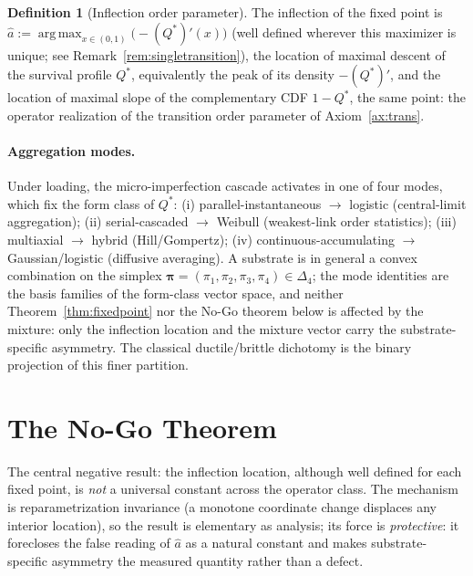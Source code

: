 \documentclass[11pt]{article}
\theoremstyle{plain}
\theoremstyle{definition}
\newtheorem{definition}[theorem]{Definition}
\theoremstyle{remark}
\DeclareMathOperator*{\argmax}{arg\,max}
\begin{document}
\begin{definition}[Inflection order parameter]\label{def:ahat}
The inflection of the fixed point is $\hat a:=\argmax_{x\in(0,1)}\big(-(Q^*)'(x)\big)$ (well defined wherever this maximizer is unique; see Remark~\ref{rem:singletransition}), the location of maximal descent of the survival profile $Q^*$, equivalently the peak of its density $-(Q^*)'$, and the location of maximal slope of the complementary CDF $1-Q^*$, the same point: the operator realization of the transition order parameter of Axiom~\ref{ax:trans}.
\end{definition}

\paragraph{Aggregation modes.} Under loading, the micro-imperfection cascade activates in one of four modes, which fix the form class of $Q^*$: (i) parallel-instantaneous $\to$ logistic (central-limit aggregation); (ii) serial-cascaded $\to$ Weibull (weakest-link order statistics); (iii) multiaxial $\to$ hybrid (Hill/Gompertz); (iv) continuous-accumulating $\to$ Gaussian/logistic (diffusive averaging). A substrate is in general a convex combination on the simplex $\boldsymbol\pi=(\pi_1,\pi_2,\pi_3,\pi_4)\in\Delta_4$; the mode identities are the basis families of the form-class vector space, and neither Theorem~\ref{thm:fixedpoint} nor the No-Go theorem below is affected by the mixture: only the inflection location and the mixture vector carry the substrate-specific asymmetry. The classical ductile/brittle dichotomy is the binary projection of this finer partition.

\section{The No-Go Theorem}\label{sec:nogo}

The central negative result: the inflection location, although well defined for each fixed point, is \emph{not} a universal constant across the operator class. The mechanism is reparametrization invariance (a monotone coordinate change displaces any interior location), so the result is elementary as analysis; its force is \emph{protective}: it forecloses the false reading of $\hat a$ as a natural constant and makes substrate-specific asymmetry the measured quantity rather than a defect.
\end{document}
